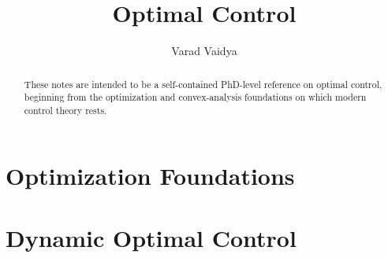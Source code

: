\documentclass[a4paper]{article}
\author{Varad Vaidya}
\title{Optimal Control}
\begin{document}
\maketitle
\newpage

\begin{abstract}
	These notes are intended to be a self-contained PhD-level reference on optimal control, beginning from the optimization and convex-analysis foundations on which modern control theory rests.
\end{abstract}

\newpage

\tableofcontents

\newpage

\part{Optimization Foundations}

\newpage

\part{Dynamic Optimal Control}

\newpage

\appendix

\end{document}
